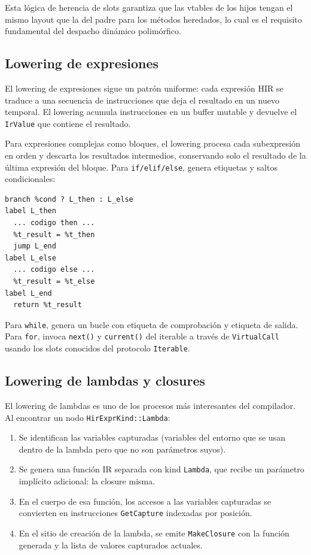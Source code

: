 \documentclass[12pt,letterpaper]{article}
\newcommand{\src}[1]{\texttt{#1}}
\begin{document}
Esta lógica de herencia de slots garantiza que las vtables de los hijos tengan el mismo layout que la del padre para los métodos heredados, lo cual es el requisito fundamental del despacho dinámico polimórfico.

\subsection{Lowering de expresiones}

El lowering de expresiones sigue un patrón uniforme: cada expresión HIR se traduce a una secuencia de instrucciones que deja el resultado en un nuevo temporal. El lowering acumula instrucciones en un buffer mutable y devuelve el \src{IrValue} que contiene el resultado.

Para expresiones complejas como bloques, el lowering procesa cada subexpresión en orden y descarta los resultados intermedios, conservando solo el resultado de la última expresión del bloque. Para \src{if/elif/else}, genera etiquetas y saltos condicionales:

\begin{lstlisting}[language=IR,caption={Patrón de lowering para if-else}]
  branch %cond ? L_then : L_else
label L_then
  ... codigo then ...
  %t_result = %t_then
  jump L_end
label L_else
  ... codigo else ...
  %t_result = %t_else
label L_end
  return %t_result
\end{lstlisting}

Para \src{while}, genera un bucle con etiqueta de comprobación y etiqueta de salida. Para \src{for}, invoca \src{next()} y \src{current()} del iterable a través de \src{VirtualCall} usando los slots conocidos del protocolo \src{Iterable}.

\subsection{Lowering de lambdas y closures}

El lowering de lambdas es uno de los procesos más interesantes del compilador. Al encontrar un nodo \src{HirExprKind::Lambda}:

\begin{enumerate}[label=\arabic*.]
    \item Se identifican las variables capturadas (variables del entorno que se usan dentro de la lambda pero que no son parámetros suyos).
    \item Se genera una función IR separada con kind \src{Lambda}, que recibe un parámetro implícito adicional: la closure misma.
    \item En el cuerpo de esa función, los accesos a las variables capturadas se convierten en instrucciones \src{GetCapture} indexadas por posición.
    \item En el sitio de creación de la lambda, se emite \src{MakeClosure} con la función generada y la lista de valores capturados actuales.
\end{enumerate}
\end{document}
